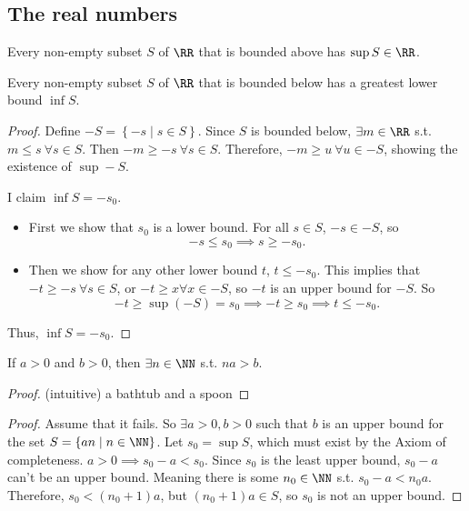 \documentclass[11pt]{scrartcl}
\numberwithin{equation}{section}
\begin{document}
\subsection{The real numbers}
\begin{axiom}
    Every non-empty subset $S$ of $\RR$ that is bounded above has 
    $\sup S \in \RR$.
\end{axiom}
\begin{corollary}
    Every non-empty subset $S$ of $\RR$ that is bounded below has 
    a greatest lower bound $\inf S$.
\end{corollary}
\begin{proof}
    Define $-S = \left\{-s \mid s \in S\right\}$. Since $S$ is bounded below,
    $\exists m \in \RR$ s.t. $m\leq s \ \forall s \in S$.
    Then $-m\geq -s \ \forall s \in S$. Therefore, $-m \geq u \ \forall u \in -S$, showing the existence of $\sup -S$.

    I claim $\inf S = -s_0$. 
    \begin{itemize}
        \item First we show that $s_0$ is a lower bound. 
        For all $s\in S$, $-s\in -S$, so 
        \[
            -s\leq s_0 \implies s\geq -s_0.
        \]

        \item Then we show for any other lower bound $t$, $t\leq -s_0$. 
        This implies that $-t\geq -s \ \forall s\in S$, or $-t\geq x \forall x \in -S$, so $-t$ is an upper bound for $-S$.
        So 
        \[ 
            -t\geq\sup(-S) = s_0 \implies -t\geq s_0 \implies t \leq -s_0. 
        \]
    \end{itemize}
    Thus, $\inf S = -s_0$.
\end{proof}
\begin{proposition}
    \label{prop:archprop}
    If $a>0$ and $b>0$, then $\exists n\in\NN$ s.t. $na > b$.
\end{proposition}
\begin{proof}
    (intuitive)
    a bathtub and a spoon
\end{proof}
\begin{proof}
    Assume that it fails. So $\exists a>0, b>0$ such that 
    $b$ is an upper bound for the set 
    $S = \left\{an \mid n \in \NN\right\}$.
    Let $s_0 = \sup S$, which must exist by the Axiom of completeness.
    $a>0 \implies s_0-a<s_0$. Since $s_0$ is the least upper bound, $s_0-a$
    can't be an upper bound. Meaning there is some $n_0\in\NN$ s.t. 
    $s_0-a<n_0a$. Therefore, $s_0 <(n_0+1)a$, but 
    $(n_0+1)a \in S$, so $s_0$ is not an upper bound.
\end{proof}
\end{document}
